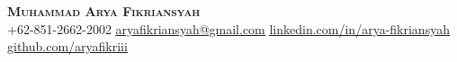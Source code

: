 \begin{center}
    \textbf{\Huge \scshape Muhammad Arya Fikriansyah} \\ \vspace{1pt}
    \small +62-851-2662-2002 \quad
    \href{mailto:aryafikriansyah@gmail.com}{\underline{aryafikriansyah@gmail.com}} \quad
    \href{https://www.linkedin.com/in/arya-fikriansyah}{\underline{linkedin.com/in/arya-fikriansyah}} \quad
    \href{https://github.com/aryafikriii}{\underline{github.com/aryafikriii}}
\end{center}